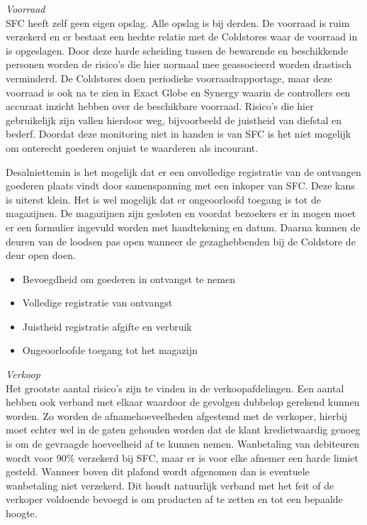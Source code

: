 \noindent
\textit{Voorraad} \\
SFC heeft zelf geen eigen opslag. Alle opslag is bij derden. De voorraad is ruim verzekerd en er bestaat een hechte relatie met de Coldstores waar de voorraad in is opgeslagen. Door deze harde scheiding tussen de bewarende en beschikkende personen worden de risico's die hier normaal mee geassocieerd worden drastisch verminderd. De Coldstores doen periodieke voorraadrapportage, maar deze voorraad is ook na te zien in Exact Globe en Synergy waarin de controllers een accuraat inzicht hebben over de beschikbare voorraad. Risico's die hier gebruikelijk zijn vallen hierdoor weg, bijvoorbeeld de juistheid van diefstal en bederf. Doordat deze monitoring niet in handen is van SFC is het niet mogelijk om onterecht goederen onjuist te waarderen als incourant.

Desalniettemin is het mogelijk dat er een onvolledige registratie van de ontvangen goederen plaats vindt door samenspanning met een inkoper van SFC. Deze kans is uiterst klein. Het is wel mogelijk dat er ongeoorloofd toegang is tot de magazijnen. De magazijnen zijn gesloten en voordat bezoekers er in mogen moet er een formulier ingevuld worden met handtekening en datum. Daarna kunnen de deuren van de loodsen pas open wanneer de gezaghebbenden bij de Coldstore de deur open doen.

\begin{itemize}
    \item Bevoegdheid om goederen in ontvangst te nemen
    \item Volledige registratie van ontvangst
    \item Juistheid registratie afgifte en verbruik
    \item Ongeoorloofde toegang tot het magazijn
\end{itemize}


\bigskip
\noindent
\textit{Verkoop} \\
Het grootste aantal risico's zijn te vinden in de verkoopafdelingen. Een aantal hebben ook verband met elkaar waardoor de gevolgen dubbelop gerekend kunnen worden. Zo worden de afnamehoeveelheden afgestemd met de verkoper, hierbij moet echter wel in de gaten gehouden worden dat de klant kredietwaardig genoeg is om de gevraagde hoeveelheid af te kunnen nemen. Wanbetaling van debiteuren wordt voor 90\% verzekerd bij SFC, maar er is voor elke afnemer een harde limiet gesteld. Wanneer boven dit plafond wordt afgenomen dan is eventuele wanbetaling niet verzekerd. Dit houdt natuurlijk verband met het feit of de verkoper voldoende bevoegd is om producten af te zetten en tot een bepaalde hoogte. 

